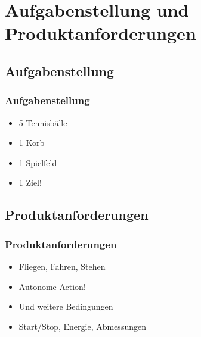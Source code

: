 \section{Aufgabenstellung und Produktanforderungen} %
\subsection{Aufgabenstellung}
\begin{frame}
    \frametitle{Aufgabenstellung}
    \begin{itemize}
    	\item 5 Tennisbälle
    	\item 1 Korb
	    \item 1 Spielfeld
	    \item 1 Ziel!
    \end{itemize}
\end{frame}
\subsection{Produktanforderungen}
\begin{frame}
    \frametitle{Produktanforderungen}
     \begin{itemize}
     	\item Fliegen, Fahren, Stehen
     	\item Autonome Action!
     	\item Und weitere Bedingungen
	     \item Start/Stop, Energie, Abmessungen
     \end{itemize}
\end{frame}
